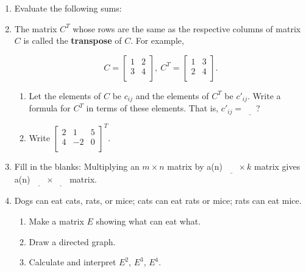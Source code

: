 \documentclass[../textbook.tex]{subfiles}
\begin{document}
\begin{enumerate}
\setcounter{enumi}{\value{problem_i}}
\item Evaluate the following sums:
\begin{enumerate}
\end{enumerate}

\item The matrix $C^T$ whose rows are the same as the respective columns of matrix $C$ is called the \textbf{transpose} of $C$. For example,

$$C=\left[\begin{array}{cc}
1 & 2 \\
3 & 4 \\
\end{array}\right],\: C^T=\left[\begin{array}{cc}
1 & 3 \\
2 & 4 \\
\end{array}\right].$$

\begin{enumerate}
\item Let the elements of $C$ be $c_{ij}$ and the elements of $C^T$ be $c'_{ij}$. Write a formula for $C^T$ in terms of these elements. That is, $c'_{ij} = \underline{\phantom{egg}}$?
\item Write $\left[\begin{array}{ccc}
2 & 1 & 5 \\
4 & -2 & 0 \\
\end{array}\right]^T$.
\end{enumerate}
\item Fill in the blanks: Multiplying an $m\times n$ matrix by a(n) $\underline{\phantom{egg}} \times k$ matrix gives a(n) $\underline{\phantom{egg}}\times\underline{\phantom{egg}}$ matrix.
\item Dogs can eat cats, rats, or mice; cats can eat rats or mice; rats can eat mice.
\begin{enumerate}
\item Make a matrix $E$ showing what can eat what.
\item Draw a directed graph.
\item Calculate and interpret $E^2$, $E^3$, $E^4$.
\end{enumerate}
\setcounter{problem_i}{\value{enumi}}
\end{enumerate}
\end{document}
